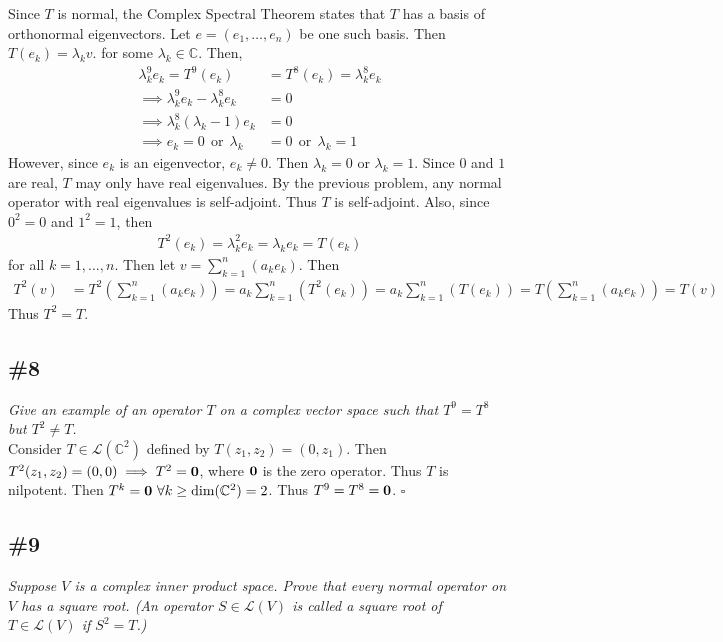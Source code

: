 \documentclass[12pt]{article}
\begin{document}
\noindent Since $T$ is normal, the Complex Spectral Theorem states that $T$ has a basis of orthonormal eigenvectors.  Let $e = (e_1, \dots, e_n)$ be one such basis.  Then $T(e_k) = \lambda_kv$.  for some $\lambda_k \in \mathbb{C}$.  Then,
\begin{align*}
		\lambda_k^9{e_k} = T^9({e_k}) &= T^8({e_k}) = \lambda_k^8{e_k} \\
		\implies \lambda_k^9{e_k} - \lambda_k^8{e_k} &= 0 \\
		\implies \lambda_k^8(\lambda_k - 1){e_k} &= 0 \\
		\implies {e_k} = 0\ \ \text{or}\ \ \lambda_k &= 0\ \ \text{or}\ \ \lambda_k = 1
\end{align*}
However, since ${e_k}$ is an eigenvector, ${e_k} \neq 0$.  Then $\lambda_k = 0$ or $\lambda_k = 1$.  Since $0$ and $1$ are real, $T$ may only have real eigenvalues.  By the previous problem, any normal operator with real eigenvalues is self-adjoint.  Thus $T$ is self-adjoint.  Also, since $0^2 = 0$ and $1^2 = 1$, then
\begin{align*}
		T^2({e_k}) = \lambda_k^2{e_k} = \lambda_k {e_k} = T({e_k})
\end{align*}
for all $k = 1, \dots, n$.  Then let $v = \displaystyle\sum\limits_{k = 1}^{n}(a_ke_k)$.  Then
\begin{align*}
		T^2(v) &= T^2\left(\sum_{k = 1}^{n}(a_ke_k)\right) = a_k\sum_{k = 1}^{n}(T^2(e_k)) = a_k\sum_{k = 1}^{n}(T(e_k)) = T\left(\sum_{k = 1}^{n}(a_ke_k)\right) = T(v)
\end{align*}  Thus $T^2 = T$.

\subsection*{\#8}
{\it Give an example of an operator $T$ on a complex vector space such that $T^9 = T^8$ but $T^2 \neq T$.} \\

\noindent Consider $T \in \mathcal{L}(\mathbb{C}^2)$ defined by $T(z_1, z_2) = (0, z_1)$.  Then $T^2(z_1, z_2) = (0, 0) \implies T^2 = \bf{0}$, where $\bf{0}$ is the zero operator.  Thus $T$ is nilpotent.  Then $T^k = {\bf0}\ \forall k \geq \text{dim}(\mathbb{C}^2) = 2$.  Thus $T^9 = T^8 = {\bf 0}$. \hfill $\square$

\subsection*{\#9}
{\it Suppose $V$ is a complex inner product space.  Prove that every normal operator on $V$ has a square root.  (An operator $S \in \mathcal{L}(V)$ is called a square root of $T \in \mathcal{L}(V)$ if $S^2 = T$.)} \\
\end{document}
